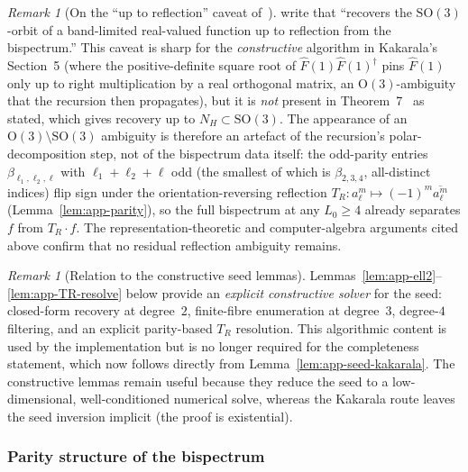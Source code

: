 \documentclass{article}
\theoremstyle{definition}
\theoremstyle{remark}
\newtheorem{remark}[theorem]{Remark}
\newcommand{\SO}{\mathrm{SO}}
\newcommand{\OG}{\mathrm{O}}
\newcommand{\conj}[1]{\overline{#1}}
\theoremstyle{definition}
\begin{document}
\begin{remark}[On the ``up to reflection'' caveat
  of~\citet{edidin2024orbit}]
\label{rem:app-edidin-reflection}
\citet[Section~1]{edidin2024orbit} write that
\citet{kakarala2012bispectrum} ``recovers the $\SO(3)$-orbit of a
band-limited real-valued function up to reflection from the
bispectrum.''  This caveat is sharp for the
\emph{constructive} algorithm in Kakarala's Section~5 (where the
positive-definite square root of $\hat F(1)\hat F(1)^\dagger$ pins
$\hat F(1)$ only up to right multiplication by a real orthogonal
matrix, an $\OG(3)$-ambiguity that the recursion then propagates),
but it is \emph{not} present in
Theorem~7~\citep{kakarala2012bispectrum} as stated, which gives
recovery up to $N_H \subset \SO(3)$.  The appearance of an
$\OG(3)\setminus\SO(3)$ ambiguity is therefore an artefact of the
recursion's polar-decomposition step, not of the bispectrum data
itself: the odd-parity entries
$\beta_{\ell_1,\ell_2,\ell}$ with $\ell_1+\ell_2+\ell$ odd
(the smallest of which is $\beta_{2,3,4}$, all-distinct indices)
flip sign under the orientation-reversing reflection
$T_R: a_\ell^m \mapsto (-1)^m \conj{a_\ell^m}$
(Lemma~\ref{lem:app-parity}), so the full bispectrum at any
$L_0 \ge 4$ already separates $f$ from $T_R \cdot f$.  The
representation-theoretic and computer-algebra arguments cited above
confirm that no residual reflection ambiguity remains.
\end{remark}

\begin{remark}[Relation to the constructive seed lemmas]
\label{rem:app-constructive-vs-structural}
Lemmas~\ref{lem:app-ell2}--\ref{lem:app-TR-resolve} below provide an
\emph{explicit constructive solver} for the seed: closed-form
recovery at degree~$2$, finite-fibre enumeration at degree~$3$,
degree-$4$ filtering, and an explicit parity-based $T_R$ resolution.
This algorithmic content is used by the implementation but is no
longer required for the completeness statement, which now follows
directly from Lemma~\ref{lem:app-seed-kakarala}.
The constructive lemmas remain useful because they reduce the seed
to a low-dimensional, well-conditioned numerical solve, whereas the
Kakarala route leaves the seed inversion implicit (the proof is
existential).
\end{remark}

\subsubsection{Parity structure of the bispectrum}
\end{document}
